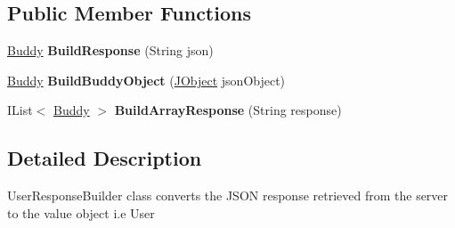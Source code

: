 \subsection*{Public Member Functions}
\begin{DoxyCompactItemize}
\item 
\hypertarget{classcom_1_1shephertz_1_1app42_1_1paas_1_1sdk_1_1csharp_1_1buddy_1_1_buddy_response_builder_a275d4003581d3aafa2c0a12d40911dce}{\hyperlink{classcom_1_1shephertz_1_1app42_1_1paas_1_1sdk_1_1csharp_1_1buddy_1_1_buddy}{Buddy} {\bfseries Build\+Response} (String json)}\label{classcom_1_1shephertz_1_1app42_1_1paas_1_1sdk_1_1csharp_1_1buddy_1_1_buddy_response_builder_a275d4003581d3aafa2c0a12d40911dce}

\item 
\hypertarget{classcom_1_1shephertz_1_1app42_1_1paas_1_1sdk_1_1csharp_1_1buddy_1_1_buddy_response_builder_a1f7f5af9593dd22f5bddcfe6788c8c36}{\hyperlink{classcom_1_1shephertz_1_1app42_1_1paas_1_1sdk_1_1csharp_1_1buddy_1_1_buddy}{Buddy} {\bfseries Build\+Buddy\+Object} (\hyperlink{class_simple_j_s_o_n_1_1_j_object}{J\+Object} json\+Object)}\label{classcom_1_1shephertz_1_1app42_1_1paas_1_1sdk_1_1csharp_1_1buddy_1_1_buddy_response_builder_a1f7f5af9593dd22f5bddcfe6788c8c36}

\item 
\hypertarget{classcom_1_1shephertz_1_1app42_1_1paas_1_1sdk_1_1csharp_1_1buddy_1_1_buddy_response_builder_a903828e4bd2027971858e623e5418369}{I\+List$<$ \hyperlink{classcom_1_1shephertz_1_1app42_1_1paas_1_1sdk_1_1csharp_1_1buddy_1_1_buddy}{Buddy} $>$ {\bfseries Build\+Array\+Response} (String response)}\label{classcom_1_1shephertz_1_1app42_1_1paas_1_1sdk_1_1csharp_1_1buddy_1_1_buddy_response_builder_a903828e4bd2027971858e623e5418369}

\end{DoxyCompactItemize}


\subsection{Detailed Description}
User\+Response\+Builder class converts the J\+S\+O\+N response retrieved from the server to the value object i.\+e User 

